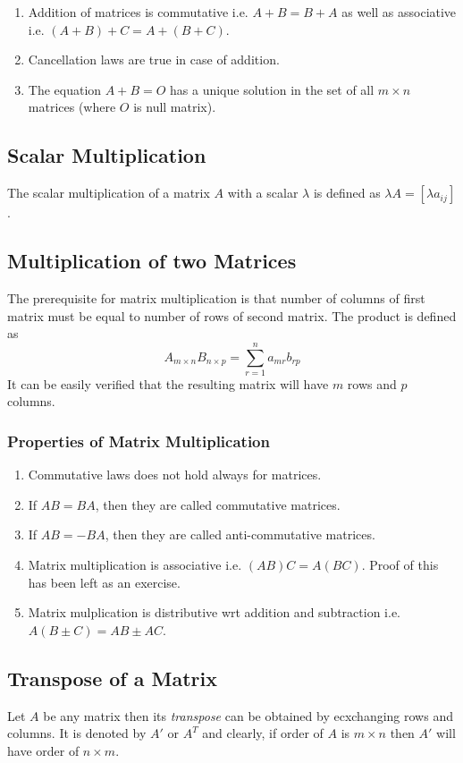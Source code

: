 \begin{enumerate}
\item Addition of matrices is commutative i.e. $A + B = B + A$ as well as associative i.e. $(A + B) + C = A + (B + C)$.
\item Cancellation laws are true in case of addition.
\item  The equation $A + B = O$ has a unique solution in the set of all $m\times n$ matrices (where $O$ is null matrix).
\end{enumerate}

\subsection{Scalar Multiplication}
The scalar multiplication of a matrix $A$ with a scalar $\lambda$ is defined as $\lambda A = [\lambda a_{ij}]$.

\subsection{Multiplication of two Matrices}
The prerequisite for matrix multiplication is that number of columns of first matrix must be equal to number of rows of second
matrix. The product is defined as
\[A_{m\times n}B_{n\times p} = \sum_{r = 1}^na_{mr}b_{rp}\]
It can be easily verified that the resulting matrix will have $m$ rows and $p$ columns.

\subsubsection{Properties of Matrix Multiplication}
\begin{enumerate}
\item Commutative laws does not hold always for matrices.
\item If $AB = BA$, then they are called commutative matrices.
\item If $AB = -BA$, then they are called anti-commutative matrices.
\item Matrix multiplication is associative i.e. $(AB)C = A(BC)$. Proof of this has been left as an exercise.
\item Matrix mulplication is distributive wrt addition and subtraction i.e. $A(B\pm C) = AB \pm AC$.
\end{enumerate}

\subsection{Transpose of a Matrix}
Let $A$ be any matrix then its \textit{transpose} can be obtained by ecxchanging rows and columns. It is denoted by $A'$ or $A^T$
and clearly, if order of $A$ is $m\times n$ then $A'$ will have order of $n\times m$.

